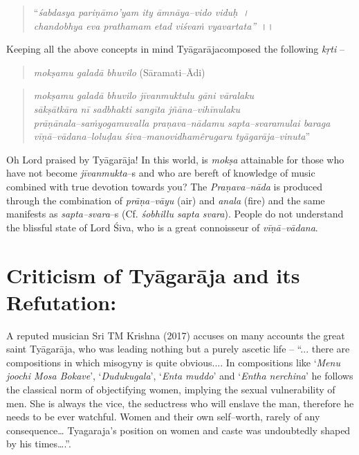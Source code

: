 \begin{verse}
“\textit{śabdasya pariṇāmo’yam ity āmnāya–vido viduḥ~।}\\\textit{chandobhya eva prathamam etad viśvaṁ vyavartata”}~।।
\end{verse}

Keeping all the above concepts in mind Tyāgarājacomposed the following \textit{kṛti} –

\begin{verse}
\textit{mokṣamu galadā bhuvilo} (Sāramati–Ādi)
\end{verse}

\begin{verse}
\textit{mokṣamu galadā bhuvilo jīvanmuktulu gāni vāralaku}\\\textit{sākṣātkāra nī sadbhakti sangīta jñāna–vihīnulaku}\\\textit{prāṇānala–saṁyogamuvalla praṇava–nādamu sapta–svaramulai baraga}\\\textit{vīṇā–vādana–loluḍau śiva–manovidhamêrugaru tyāgarāja–vinuta}”
\end{verse}

Oh Lord praised by Tyāgarāja! In this world, is \textit{mokṣa} attainable for those who have not become \textit{jīvanmukta}–s and who are bereft of knowledge of music combined with true devotion towards you? The \textit{Praṇava–nāda} is produced through the combination of \textit{prāṇa–vāyu} (air) and \textit{anala} (fire) and the same manifests as \textit{sapta–svara}–s (Cf. \textit{śobhillu sapta svara}). People do not understand the blissful state of Lord Śiva, who is a great connoisseur of \textit{vīṇā–vādana}.


\section*{Criticism of Tyāgarāja and its Refutation:}

A reputed musician Sri TM Krishna (2017) accuses on many accounts the great saint Tyāgarāja, who was leading nothing but a purely ascetic life – “... there are compositions in which misogyny is quite obvious.... In compositions like ‘\textit{Menu joochi Mosa Bokave}’, ‘\textit{Dudukugala}’, ‘\textit{Enta muddo}’ and ‘\textit{Entha nerchina}’ he follows the classical norm of objectifying women, implying the sexual vulnerability of men. She is always the vice, the seductress who will enslave the man, therefore he needs to be ever watchful. Women and their own self–worth, rarely of any consequence… Tyagaraja’s position on women and caste was undoubtedly shaped by his times….”.

